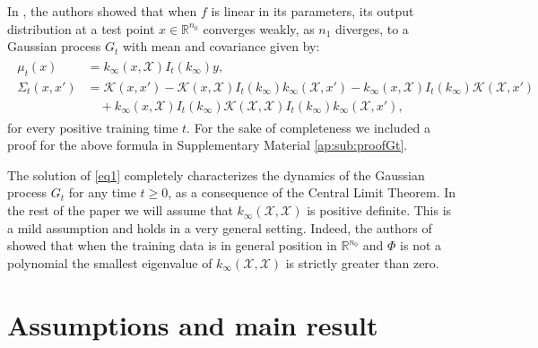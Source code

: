 \documentclass{article}
\theoremstyle{definition}
\newtheorem{ass}{Assumption}
\theoremstyle{remark}
\newtheorem{rem}[thm]{Remark}
\numberwithin{equation}{section}
\newcommand{\X}{\mathcal{X}}
\newcommand{\R}{\mathbb{R}}
\begin{document}
In \cite{Lee2020}, the authors showed that when $f$ is linear in its parameters, its output distribution at a test point $x \in \R^{n_0}$ converges weakly,
 as $n_1$ diverges, to a Gaussian process $G_t$ with mean and covariance given by:
\begin{align}
    \begin{split}
        \label{characterization}
    \mu_t(x) &= k_\infty(x,\X) I_t(k_\infty)y,\\
    \Sigma_t(x,x')&=\mathcal K(x,x') - \mathcal K(x,\X)I_t(k_\infty)k_\infty(\X,x')- k_\infty(x,\X)I_t(k_\infty)\mathcal K(\X,x')\\
    &\quad + k_\infty(x,\X)I_t(k_\infty)\mathcal K(\X,\X)I_t(k_\infty)k_\infty(\X,x'),
    \end{split}
    \end{align}
for every positive training time $t$.
For the sake of completeness we included a proof for the above formula in Supplementary Material \ref{ap:sub:proofGt}.


The solution of \eqref{eq1} completely characterizes the dynamics of the Gaussian process $G_t$ for any time $t\ge 0$, as a consequence of the Central Limit Theorem.
In the rest of the paper we will assume that $k_\infty(\X,\X)$ is positive definite.
This is a mild assumption and holds in a very general setting.
Indeed, the authors of \cite{carvalho2024} showed that when the training data is in general position in $\R^{n_0}$ and $\Phi$ is not a polynomial the smallest eigenvalue of $k_\infty(\X,\X)$ is strictly greater than zero.


\section{Assumptions and main result}
\label{sec:mainresult}
\end{document}
